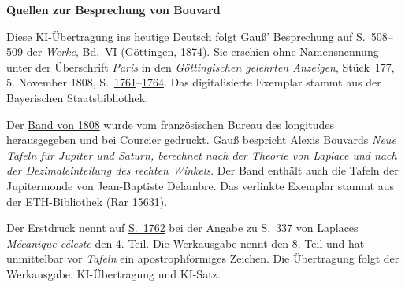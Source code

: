 \clearpage\thispagestyle{empty}
\begin{center}\textbf{Quellen zur Besprechung von Bouvard}\end{center}
\noindent Diese KI-Übertragung ins heutige Deutsch folgt Gauß’ Besprechung auf S.~508--509 der \href{https://gdz.sub.uni-goettingen.de/id/PPN236007467}{\textit{Werke}, Bd.~VI} (Göttingen, 1874). Sie erschien ohne Namensnennung unter der Überschrift \emph{Paris} in den \textit{Göttingischen gelehrten Anzeigen}, Stück~177, 5. November 1808, S.~\href{https://api.digitale-sammlungen.de/iiif/image/v2/bsb10538674_00745/full/1800,/0/default.jpg}{1761}--\href{https://api.digitale-sammlungen.de/iiif/image/v2/bsb10538674_00748/full/1800,/0/default.jpg}{1764}. Das digitalisierte Exemplar stammt aus der Bayerischen Staatsbibliothek.
\par\smallskip\noindent Der \href{https://www.e-rara.ch/zut/content/titleinfo/21914082}{Band von 1808} wurde vom französischen Bureau des longitudes herausgegeben und bei Courcier gedruckt. Gauß bespricht Alexis Bouvards \emph{Neue Tafeln für Jupiter und Saturn, berechnet nach der Theorie von Laplace und nach der Dezimaleinteilung des rechten Winkels}. Der Band enthält auch die Tafeln der Jupitermonde von Jean-Baptiste Delambre. Das verlinkte Exemplar stammt aus der ETH-Bibliothek (Rar 15631).
\par\smallskip\noindent Der Erstdruck nennt auf \href{https://api.digitale-sammlungen.de/iiif/image/v2/bsb10538674_00746/full/1800,/0/default.jpg}{S.~1762} bei der Angabe zu S.~337 von Laplaces \textit{Mécanique céleste} den 4. Teil. Die Werkausgabe nennt den 8. Teil und hat unmittelbar vor \emph{Tafeln} ein apostrophförmiges Zeichen. Die Übertragung folgt der Werkausgabe. KI-Übertragung und KI-Satz.
\clearpage
